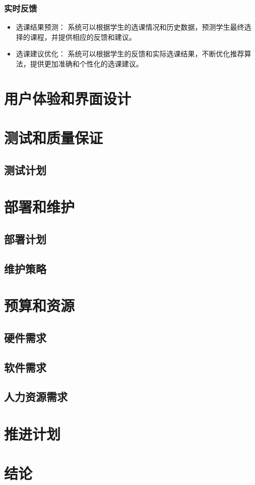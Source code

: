 \documentclass{article}
\begin{document}
\subsubsection{实时反馈}
\begin{itemize}
\item 选课结果预测： 系统可以根据学生的选课情况和历史数据，预测学生最终选择的课程，并提供相应的反馈和建议。
\item 选课建议优化： 系统可以根据学生的反馈和实际选课结果，不断优化推荐算法，提供更加准确和个性化的选课建议。
\end{itemize}


\section{用户体验和界面设计}

\section{测试和质量保证}
\subsection{测试计划}
\section{部署和维护}
\subsection{部署计划}
\subsection{维护策略}

\section{预算和资源}
\subsection{硬件需求}
\subsection{软件需求}
\subsection{人力资源需求}

\section{推进计划}

\section{结论}
\end{document}
